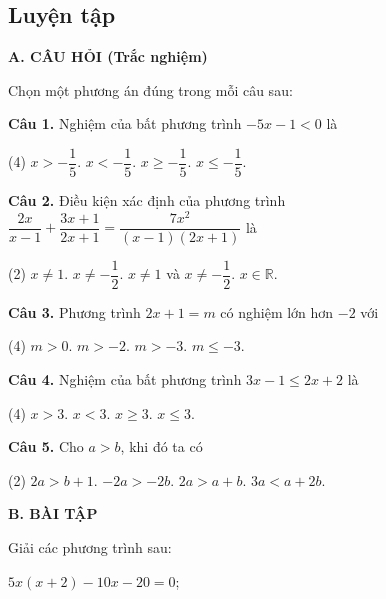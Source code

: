 \begin{practice}
    \subsection{Luyện tập}

    \textbf{A. CÂU HỎI (Trắc nghiệm)}

    Chọn một phương án đúng trong mỗi câu sau:

    \textbf{Câu 1.} Nghiệm của bất phương trình $-5x-1<0$ là
    \begin{tasks}[label=\Alph*.](4)
        \task $x>-\dfrac{1}{5}$.
        \task $x<-\dfrac{1}{5}$.
        \task $x\geq-\dfrac{1}{5}$.
        \task $x\leq-\dfrac{1}{5}$.
    \end{tasks}

    \textbf{Câu 2.} Điều kiện xác định của phương trình $\dfrac{2x}{x-1}+\dfrac{3x+1}{2x+1}=\dfrac{7x^2}{(x-1)(2x+1)}$ là
    \begin{tasks}[label=\Alph*.](2)
        \task $x\ne1$.
        \task $x\ne-\dfrac{1}{2}$.
        \task $x\ne1$ và $x\ne-\dfrac{1}{2}$.
        \task $x\in\mathbb{R}$.
    \end{tasks}

    \textbf{Câu 3.} Phương trình $2x+1=m$ có nghiệm lớn hơn $-2$ với
    \begin{tasks}[label=\Alph*.](4)
        \task $m>0$.
        \task $m>-2$.
        \task $m>-3$.
        \task $m\leq-3$.
    \end{tasks}

    \textbf{Câu 4.} Nghiệm của bất phương trình $3x-1\leq2x+2$ là
    \begin{tasks}[label=\Alph*.](4)
        \task $x>3$.
        \task $x<3$.
        \task $x\geq3$.
        \task $x\leq3$.
    \end{tasks}

    \textbf{Câu 5.} Cho $a>b$, khi đó ta có
    \begin{tasks}[label=\Alph*.](2)
        \task $2a>b+1$.
        \task $-2a>-2b$.
        \task $2a>a+b$.
        \task $3a<a+2b$.
    \end{tasks}

    \textbf{B. BÀI TẬP}

    \begin{questions}[resume=SBT]
        \item Giải các phương trình sau:
        \begin{questions}
            \item $5x(x+2)-10x-20=0$;


\end{questions}
\end{questions}
\end{practice}
